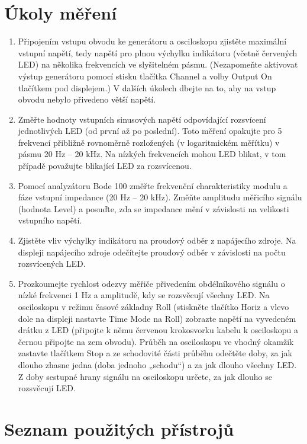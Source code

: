 \documentclass[a4paper, czech]{article}
\begin{document}
\pagebreak

\section{Úkoly měření}

\begin{enumerate}
    \item Připojením vstupu obvodu ke generátoru a osciloskopu zjistěte maximální vstupní napětí, tedy napětí pro plnou výchylku indikátoru (včetně červených LED) na několika frekvencích ve slyšitelném pásmu. (Nezapomeňte aktivovat výstup generátoru pomocí stisku tlačítka Channel a volby Output On tlačítkem pod displejem.) V dalších úkolech dbejte na to, aby na vstup obvodu nebylo přivedeno větší napětí.
    \item Změřte hodnoty vstupních sinusových napětí odpovídající rozsvícení jednotlivých LED (od první až po poslední). Toto měření opakujte pro 5 frekvencí přibližně rovnoměrně rozložených (v logaritmickém měřítku) v pásmu 20 Hz – 20 kHz. Na nízkých frekvencích mohou LED blikat, v tom případě považujte blikající LED za rozsvícenou.
    \item Pomocí analyzátoru Bode 100 změřte frekvenční charakteristiky modulu a fáze vstupní impedance (20 Hz – 20 kHz). Změňte amplitudu měřicího signálu (hodnota Level) a posuďte, zda se impedance mění v závislosti na velikosti vstupního napětí.
    \item Zjistěte vliv výchylky indikátoru na proudový odběr z napájecího zdroje. Na displeji napájecího zdroje odečítejte proudový odběr v závislosti na počtu rozsvícených LED.
    \item Prozkoumejte rychlost odezvy měřiče přivedením obdélníkového signálu o nízké frekvenci 1 Hz a amplitudě, kdy se rozsvěcují všechny LED. Na osciloskopu v režimu časové základny Roll (stiskněte tlačítko Horiz a vlevo dole na displeji nastavte Time Mode na Roll) zobrazte napětí na vyvedeném drátku z LED (připojte k němu červenou krokosvorku kabelu k osciloskopu a černou připojte na zem obvodu). Průběh na osciloskopu ve vhodný okamžik zastavte tlačítkem Stop a ze schodovité části průběhu odečtěte doby, za jak dlouho zhasne jedna (doba jednoho „schodu“) a za jak dlouho všechny LED. Z doby sestupné hrany signálu na osciloskopu určete, za jak dlouho se rozsvěcují LED. 
\end{enumerate}

\section{Seznam použitých přístrojů}
\end{document}
